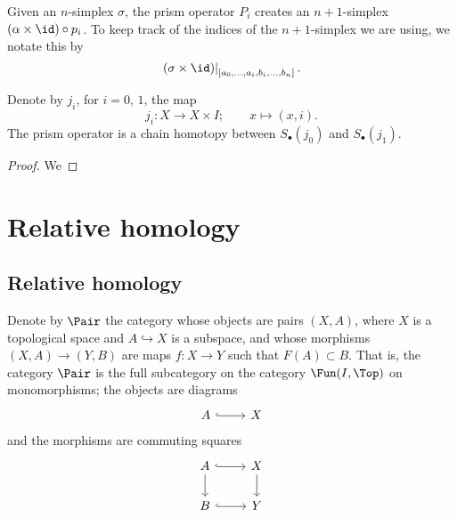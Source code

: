 \documentclass[main.tex]{subfiles}
\begin{document}
Given an \(n\)-simplex \(\sigma\), the prism operator \(P_{i}\) creates an \(n+1\)-simplex \((\alpha \times \id) \circ p_{i}\). To keep track of the indices of the \(n+1\)-simplex we are using, we notate this by
\begin{equation*}
  \left. (\sigma \times \id) \right|_{[a_{0}, \ldots, a_{i}, b_{i}, \ldots, b_{n}]}.
\end{equation*}

\begin{proposition}
  Denote by \(j_{i}\), for \(i = 0\), \(1\), the map
  \begin{equation*}
    j_{i}\colon X \to X \times I;\qquad x \mapsto (x, i).
  \end{equation*}
  The prism operator is a chain homotopy between \(S_{\bullet}(j_{0})\) and \(S_{\bullet}(j_{1})\).
\end{proposition}
\begin{proof}
  We
\end{proof}

\section{Relative homology}
\label{sec:relative_homology}

\subsection{Relative homology}
\label{ssc:relative_homology}

Denote by $\Pair$ the category whose objects are pairs $(X, A)$, where $X$ is a topological space and $A \hookrightarrow X$ is a subspace, and whose morphisms $(X, A) \to (Y, B)$ are maps $f\colon X \to Y$ such that $F(A) \subset B$. That is, the category \(\Pair\) is the full subcategory on the category \(\Fun(I, \Top)\) on monomorphisms; the objects are diagrams
\begin{equation*}
  \begin{tikzcd}
    A
    \arrow[r, hookrightarrow]
    & X
  \end{tikzcd}
\end{equation*}
and the morphisms are commuting squares
\begin{equation*}
  \begin{tikzcd}
    A
    \arrow[r, hookrightarrow]
    \arrow[d]
    & X
    \arrow[d]
    \\
    B
    \arrow[r, hookrightarrow]
    & Y
  \end{tikzcd}
\end{equation*}
\end{document}
